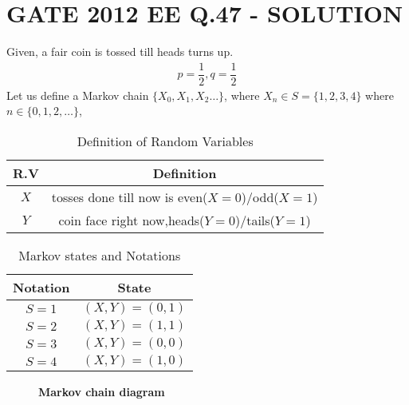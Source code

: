 \documentclass[journal,12pt,twocolumn]{IEEEtran}
\begin{document}
\section*{GATE 2012 EE Q.47 - SOLUTION}
Given, a fair coin is tossed till heads turns up.
\begin{align}
\tag{47.1}
\label{eq:0}
    p=\dfrac{1}{2},q=\dfrac{1}{2}
\end{align}
    Let us define a Markov chain $\{X_{0},X_{1},X_{2}\dots\}$, where $X_{n}\in S=\{1,2,3,4\}$ where $n\in \{0,1,2,\dots\}$, 
\begin{table}[h!]
\centering
\caption{Definition of Random Variables}
\label{table:1}
\begin{tabular}{|c|c|}
    \hline
    R.V & Definition \\
    \hline
    $X$ & tosses done till now is even($X=0$)/odd($X=1$) \\[1ex]
    \hline
    $Y$ & coin face right now,heads($Y=0$)/tails($Y=1$) \\[1ex]
    \hline
\end{tabular}
\end{table}    
\begin{table}[h!]
\centering
\caption{Markov states and Notations }
\label{table:2}
\begin{tabular}{|c|c|}
    \hline
    Notation & State \\
    \hline
    $S=1$ & $(X,Y)=(0,1)$ \\[1ex]
    \hline
    $S=2$ & $(X,Y)=(1,1)$\\[1ex]
    \hline
    $S=3$ & $(X,Y)=(0,0)$\\[1ex]
    \hline
    $S=4$ & $(X,Y)=(1,0)$\\[1ex]
    \hline
\end{tabular}
\end{table}
\begin{figure}[h]
\caption*{\textbf{Markov chain diagram}}
\centering
{}
\end{figure}
\end{document}
